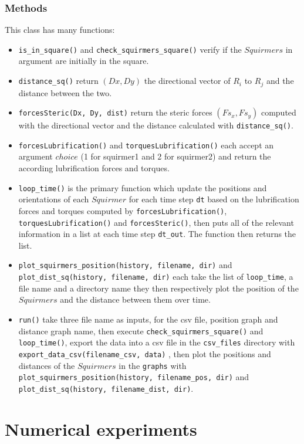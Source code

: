 \documentclass{article}
\begin{document}
\subsubsection*{Methods}
This class has many functions:
\begin{itemize}
   \item \texttt{is\_in\_square()} and \texttt{check\_squirmers\_square()} verify if the $Squirmers$ 
   in argument are initially in the square.
   \item \texttt{distance\_sq()} return $(Dx, Dy)$ the directional vector of $R_{i}$ to $R_{j}$ 
   and the distance between the two.
   \item \texttt{forcesSteric(Dx, Dy, dist)} return the steric forces $(Fs_x, Fs_y)$ computed with the directional vector and the distance calculated with \texttt{distance\_sq()}.
   \item \texttt{forcesLubrification()} and \texttt{torquesLubrification()} each accept an argument $choice$ (1 for squirmer1 and 2 for squirmer2)
   and return the according lubrification forces and torques.
   \item \texttt{loop\_time()} is the primary function which update the positions and orientations of each $Squirmer$
   for each time step \texttt{dt} based on the lubrification forces and torques computed by \texttt{forcesLubrification()}, 
   \texttt{torquesLubrification()} and \texttt{forcesSteric()}, then puts all of the relevant information in a list
   at each time step \texttt{dt\_out}. The function then returns the list.
   \item \texttt{plot\_squirmers\_position(history, filename, dir)} and \texttt{plot\_dist\_sq(history, filename, dir)} 
   each take the list of \texttt{loop\_time}, a file name and a directory name
   they then respectively plot the position of the $Squirmers$ and the distance between them over time.
   \item \texttt{run()} take three file name as inputs, for the csv file, position graph and distance graph name, 
   then execute \texttt{check\_squirmers\_square()} and \texttt{loop\_time()},
   export the data into a csv file in the \texttt{csv\_files} directory with \texttt{export\_data\_csv(filename\_csv, data)} 
   , then plot the positions and distances of the $Squirmers$ in the \texttt{graphs} with \texttt{plot\_squirmers\_position(history, filename\_pos, dir)}
   and \texttt{plot\_dist\_sq(history, filename\_dist, dir)}.
\end{itemize}

\section{Numerical experiments}
\end{document}
